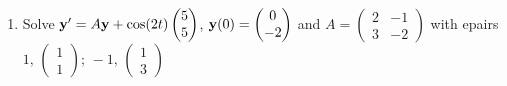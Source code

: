 \documentclass[12pt,letterpaper]{article}
\newcommand{\KeyBox}[3]{\vcenter{\hbox{$\boxed{\parbox[c][#2][c]{#1}{\centering\small\setlength{\arraycolsep}{3pt}\ensuremath{\displaystyle #3}}}$}}}
\newcommand{\KeySide}[2]{\quad\vcenter{\hbox{\parbox{#1}{\footnotesize\setlength{\arraycolsep}{2pt}\ensuremath{\begin{gathered}#2\end{gathered}}}}}}
\begin{document}
\begin{enumerate}
\begin{enumerate}
\item  Row reducing
$\KeyBox{1.8in}{0.80in}{\left[\begin{array}{rr|r}1&1&3\\1&-1&-1\end{array}\right]}\KeySide{2.8in}{\left[\begin{pmatrix}1&1\\1&-1\end{pmatrix}\mid\vect{y}(0)-\vect{a}\right]\\\begin{pmatrix}4\\0\end{pmatrix}-\vect{a}=\begin{pmatrix}3\\-1\end{pmatrix}\\\vect{c}=\begin{pmatrix}1\\2\end{pmatrix}}$
\par
gives constants $\vect{c}$ in
\par
$\vect{y}(t)=\KeyBox{3.2in}{0.80in}{\begin{pmatrix}e^{5t}+2e^{-t}\\e^{5t}-2e^{-t}\end{pmatrix}+e^{-2t}\begin{pmatrix}1\\1\end{pmatrix}}$
\end{enumerate}
\newpage
\item \begingroup
\setlength{\arraycolsep}{3pt}
Solve
$
  \mathbf{y}'=A\mathbf{y}+\cos(2t)\begin{pmatrix}5\\5\end{pmatrix}
  $, $\mathbf{y}(0)=\begin{pmatrix}0\\-2\end{pmatrix}$
and
$A=\begin{pmatrix}2&-1\\3&-2\end{pmatrix}$ with epairs
$
  1,\, \begin{pmatrix}1\\1\end{pmatrix};\, -1,\, \begin{pmatrix}1\\3\end{pmatrix}
$
\endgroup
\begin{enumerate}

\end{enumerate}
\end{enumerate}
\end{document}
